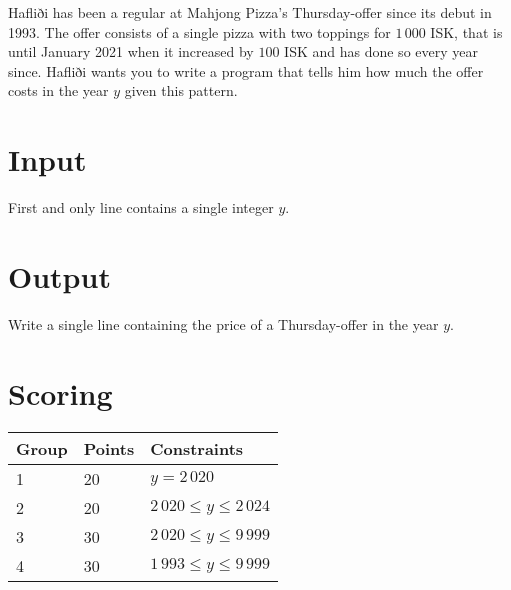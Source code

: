 
Hafliði has been a regular at Mahjong Pizza's Thursday-offer since its debut in 1993. The offer
consists of a single pizza with two toppings for $1\,000$ ISK, that is until January 2021 when it increased by $100$ ISK and
has done so every year since. Hafliði wants you to write a program that tells him how much the offer costs in the year $y$
given this pattern.

\section*{Input}
First and only line contains a single integer $y$.

\section*{Output}
Write a single line containing the price of a Thursday-offer in the year $y$.

\section*{Scoring}
\begin{tabular}{|l|l|l|}
\hline
Group & Points & Constraints \\ \hline
1     & 20   & $y = 2\,020$ \\ \hline
2     & 20   & $2\,020 \leq y \leq 2\,024$ \\ \hline
3     & 30   & $2\,020 \leq y \leq 9\,999$ \\ \hline
4     & 30   & $1\,993 \leq y \leq 9\,999$ \\ \hline

\end{tabular}
